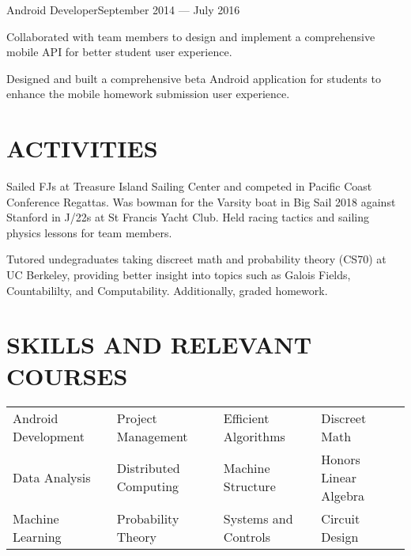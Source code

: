 \documentclass[10pt]{article}
\begin{document}
                  	 
                {Android Developer}{September 2014 --- July 2016}
                 			\begin{accomplishments}					        
                   			\item Collaborated with team members to design and implement a comprehensive mobile API for better student user experience.
                   			\item Designed and built a comprehensive beta Android application for students to enhance the mobile homework submission user experience.
                  		 \end{accomplishments}
                  		 
                  
\section*{ACTIVITIES}
        {Sailed FJs at Treasure Island Sailing Center and competed in Pacific Coast Conference Regattas. Was bowman for the Varsity boat in Big Sail 2018 against Stanford in J/22s at St Francis Yacht Club. Held racing tactics and sailing physics lessons for team members.}

				{Tutored undegraduates taking discreet math and probability theory (CS70) at UC Berkeley, providing 	better insight into topics such as Galois Fields, Countabililty, and Computability. Additionally, graded homework.}

                


\section*{SKILLS AND RELEVANT COURSES}
				\setlength{\columnsep}{.5pt}
				\begin{tabu}{X[2c]X[2.1c]X[2c]X[2c]}
					Android Development  & Project Management & Efficient Algorithms & Discreet Math \\
					Data Analysis 			   & Distributed Computing & Machine Structure & Honors Linear Algebra \\
					Machine Learning		   & Probability Theory & Systems and Controls & Circuit Design \\
				\end{tabu}
 
\end{document}
